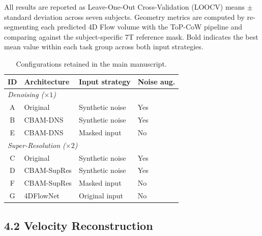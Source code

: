 \documentclass[11pt]{article}
\begin{document}
All results are reported as Leave-One-Out Cross-Validation (LOOCV) means $\pm$ standard
deviation across seven subjects. Geometry metrics are computed by re-segmenting each predicted
4D Flow volume with the ToP-CoW pipeline and comparing against the subject-specific 7T
reference mask. Bold indicates the best mean value within each task group across both input
strategies.

\begin{table}[!htbp]
  \centering
  \caption{Configurations retained in the main manuscript.}
  \label{tab:experiment_map}
  \small
  \begin{tabular}{clll}
    \toprule
    ID & Architecture & Input strategy & Noise aug. \\
    \midrule
    \multicolumn{4}{l}{\textit{Denoising ($\times 1$)}} \\
    \midrule
    A & Original  & Synthetic noise & Yes \\
    B & CBAM-DNS  & Synthetic noise & Yes \\
    E & CBAM-DNS  & Masked input    & No  \\
    \midrule
    \multicolumn{4}{l}{\textit{Super-Resolution ($\times 2$)}} \\
    \midrule
    C & Original    & Synthetic noise & Yes \\
    D & CBAM-SupRes & Synthetic noise & Yes \\
    F & CBAM-SupRes & Masked input    & No  \\
    G & 4DFlowNet   & Original input  & No  \\
    \bottomrule
  \end{tabular}
\end{table}

\subsection*{4.2 Velocity Reconstruction}
\label{sec:velocity}
\end{document}
